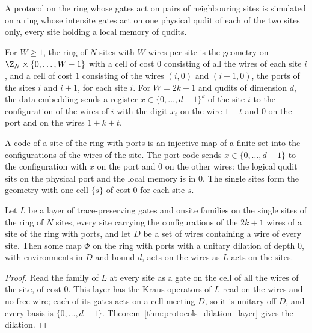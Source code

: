 A protocol on the ring whose gates act on pairs of neighbouring sites is simulated on a ring
whose intersite gates act on one physical qudit of each of the two sites only, every site
holding a local memory of qudits.

\begin{definition}
    \label{def:protocols_port_ring}
    \leanok
    For $W\ge1$, the ring of $N$ sites with $W$ wires per site is the geometry on $\Z_N\times\{0,\dots,W-1\}$
    with a cell of cost $0$ consisting of all the wires of each site $i$, and a cell of cost $1$
    consisting of the wires $(i,0)$ and $(i+1,0)$, the ports of the sites $i$ and $i+1$, for
    each site $i$. For $W=2k+1$ and qudits of dimension $d$, the data embedding sends a
    register $x\in\{0,\dots,d-1\}^k$ of the site $i$ to the configuration of the wires of $i$
    with the digit $x_t$ on the wire $1+t$ and $0$ on the port and on the wires $1+k+t$.
\end{definition}

\begin{definition}
    \label{def:protocols_port_code}
    \leanok
    A code of a site of the ring with ports is an injective map of a finite set into the
    configurations of the wires of the site. The port code sends $x\in\{0,\dots,d-1\}$ to the
    configuration with $x$ on the port and $0$ on the other wires: the logical qudit sits on
    the physical port and the local memory is in $0$. The single sites form the geometry with
    one cell $\{s\}$ of cost $0$ for each site $s$.
\end{definition}

\begin{lemma}
    \label{lem:protocols_port_sites}
    \leanok
    Let $L$ be a layer of trace-preserving gates and onsite families on the single sites of
    the ring of $N$ sites, every site carrying the configurations of the $2k+1$ wires of a site
    of the ring with ports, and let $D$ be a set of wires containing a wire of every site. Then
    some map $\Phi$ on the ring with ports with a unitary dilation of depth $0$, with
    environments in $D$ and bound $d$, acts on the wires as $L$ acts on the sites.
\end{lemma}
\begin{proof}\leanok
    Read the family of $L$ at every site as a gate on the cell of all the wires of the site, of
    cost $0$. This layer has the Kraus operators of $L$ read on the wires and no free wire; each
    of its gates acts on a cell meeting $D$, so it is unitary off $D$, and every basis is
    $\{0,\dots,d-1\}$. Theorem~\ref{thm:protocols_dilation_layer} gives the dilation.
\end{proof}

